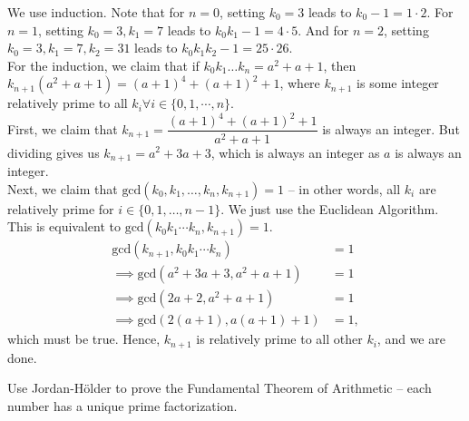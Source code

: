 \documentclass{scrartcl}
\begin{document}
\begin{soln}
	We use induction. Note that for $n=0$, setting $k_0=3$ leads to $k_0-1 = 1 \cdot 2$. For $n=1$, setting $k_0=3, k_1=7$ leads to $k_0k_1-1 = 4 \cdot 5$. And for $n=2$, setting $k_0=3, k_1=7, k_2=31$ leads to $k_0k_1k_2-1 = 25 \cdot 26$. \\
	For the induction, we claim that if $k_0k_1 \dotsc k_n = a^2+a+1$, then $k_{n+1}(a^2+a+1) = (a+1)^4+(a+1)^2+1$, where $k_{n+1}$ is some integer relatively prime to all $k_i \forall i \in \{0,1, \cdots, n\}$. \\
	First, we claim that $k_{n+1} = \dfrac{(a+1)^4 + (a+1)^2 + 1}{a^2+a+1}$ is always an integer. But dividing gives us $k_{n+1} = a^2+3a+3$, which is always an integer as $a$ is always an integer. \\
	Next, we claim that $\text{gcd}(k_0, k_1, \dotsc, k_n, k_{n+1}) = 1$ -- in other words, all $k_i$ are relatively prime for $i \in \{0, 1, \dotsc, n-1\}$. We just use the Euclidean Algorithm. This is equivalent to $\text{gcd}(k_0k_1 \cdots k_n, k_{n+1}) = 1$.
	\begin{align*}
		\text{gcd}(k_{n+1}, k_0k_1\cdots k_n) &= 1 \\
		\implies \text{gcd}(a^2+3a+3, a^2+a+1) &= 1 \\
		\implies \text{gcd}(2a+2, a^2+a+1) &= 1 \\
		\implies \text{gcd}(2(a+1), a(a+1)+1) &= 1,
	\end{align*}
	which must be true. Hence, $k_{n+1}$ is relatively prime to all other $k_i$, and we are done.
\end{soln}

\begin{problem}[14]
	Use Jordan-Hölder to prove the Fundamental Theorem of Arithmetic -- each number has a unique prime factorization.
\end{problem}
\end{document}
